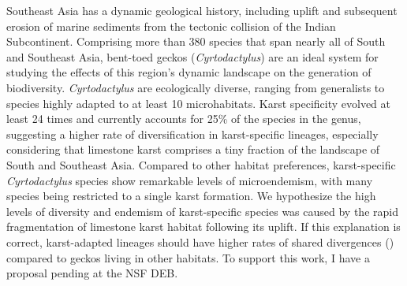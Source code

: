 Southeast Asia has a dynamic geological history, including uplift and
subsequent erosion of marine sediments from the tectonic collision of the
Indian Subcontinent.
Comprising
more than 380
species that span nearly all of South and Southeast
Asia,
bent-toed geckos (\textit{Cyrtodactylus}) are an ideal system for studying
the effects of this region's dynamic landscape on the generation of
biodiversity.
\textit{Cyrtodactylus} are ecologically diverse, ranging from generalists
to species highly adapted to at least 10 microhabitats.
Karst specificity evolved at least 24 times and currently
accounts for 25\% of the species in the genus,
suggesting a higher rate of diversification in karst-specific
lineages, especially considering that limestone karst comprises a tiny fraction
of the landscape of South and Southeast Asia.
Compared to other habitat preferences,
karst-specific \textit{Cyrtodactylus} species show remarkable levels
of microendemism, with many species being restricted to a single
karst formation.
We hypothesize the high levels of diversity and endemism of karst-specific
species was caused by the rapid fragmentation of limestone karst
habitat following its uplift.
If this explanation is correct, karst-adapted lineages should have higher rates
of shared divergences (\burstrate) compared to geckos living in other habitats.
To support this work, I have a proposal pending at the NSF DEB.


